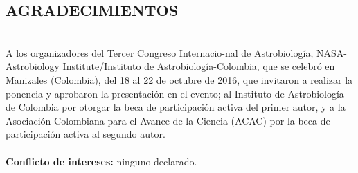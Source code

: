 \documentclass[12pt,letterpaper]{article}
\begin{document}
\begin{multicols}{2}
\section*{ \small {AGRADECIMIENTOS}}\\
\noindent A  los  organizadores  del  Tercer  Congreso  Internacio-nal de  Astrobiología,  NASA-Astrobiology  Institute/Instituto  de  Astrobiología-Colombia,  que  se  celebró  en Manizales (Colombia), del 18 al 22 de octubre de 2016, que invitaron a realizar la ponencia y aprobaron la presentación en el evento; al Instituto de Astrobiología de Colombia por otorgar la beca de participación activa del primer autor, y a la Asociación Colombiana para el Avance de la Ciencia (ACAC) por la beca de participación activa al segundo autor.\\
\\
\textbf{Conflicto de intereses:} ninguno declarado.

\end{multicols}
\newpage

\end{document}
